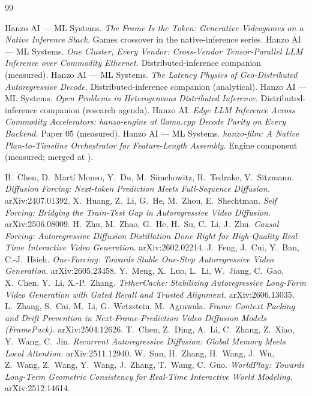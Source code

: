 \documentclass[11pt]{article}
\begin{document}
\begin{thebibliography}{99}
\small

 Hanzo AI --- ML Systems. \emph{The Frame Is the Token: Generative Videogames on a Native
Inference Stack.} Games crossover in the native-inference series.
 Hanzo AI --- ML Systems. \emph{One Cluster, Every Vendor: Cross-Vendor Tensor-Parallel LLM
Inference over Commodity Ethernet.} Distributed-inference companion (measured).
 Hanzo AI --- ML Systems. \emph{The Latency Physics of Geo-Distributed Autoregressive Decode.}
Distributed-inference companion (analytical).
 Hanzo AI --- ML Systems. \emph{Open Problems in Heterogeneous Distributed Inference.}
Distributed-inference companion (research agenda).
 Hanzo AI. \emph{Edge LLM Inference Across Commodity Accelerators: hanzo-engine at llama.cpp
Decode Parity on Every Backend.} Paper 05 (measured).
 Hanzo AI --- ML Systems. \emph{hanzo-film: A Native Plan-to-Timeline Orchestrator for
Feature-Length Assembly.} Engine component (measured; merged at ).

 B.\ Chen, D.\ Mart\'i Monso, Y.\ Du, M.\ Simchowitz, R.\ Tedrake, V.\ Sitzmann.
\emph{Diffusion Forcing: Next-token Prediction Meets Full-Sequence Diffusion.} arXiv:2407.01392.
 X.\ Huang, Z.\ Li, G.\ He, M.\ Zhou, E.\ Shechtman. \emph{Self Forcing: Bridging the
Train-Test Gap in Autoregressive Video Diffusion.} arXiv:2506.08009.
 H.\ Zhu, M.\ Zhao, G.\ He, H.\ Su, C.\ Li, J.\ Zhu. \emph{Causal Forcing: Autoregressive
Diffusion Distillation Done Right for High-Quality Real-Time Interactive Video Generation.} arXiv:2602.02214.
 J.\ Feng, J.\ Cui, Y.\ Ban, C.-J.\ Hsieh. \emph{One-Forcing: Towards Stable One-Step
Autoregressive Video Generation.} arXiv:2605.23458.
 Y.\ Meng, X.\ Luo, L.\ Li, W.\ Jiang, C.\ Gao, X.\ Chen, Y.\ Li, X.-P.\ Zhang.
\emph{TetherCache: Stabilizing Autoregressive Long-Form Video Generation with Gated Recall and Trusted
Alignment.} arXiv:2606.13035.
 L.\ Zhang, S.\ Cai, M.\ Li, G.\ Wetzstein, M.\ Agrawala. \emph{Frame Context Packing and
Drift Prevention in Next-Frame-Prediction Video Diffusion Models (FramePack).} arXiv:2504.12626.
 T.\ Chen, Z.\ Ding, A.\ Li, C.\ Zhang, Z.\ Xiao, Y.\ Wang, C.\ Jin. \emph{Recurrent Autoregressive
Diffusion: Global Memory Meets Local Attention.} arXiv:2511.12940.
 W.\ Sun, H.\ Zhang, H.\ Wang, J.\ Wu, Z.\ Wang, Z.\ Wang, Y.\ Wang, J.\ Zhang, T.\ Wang,
C.\ Guo. \emph{WorldPlay: Towards Long-Term Geometric Consistency for Real-Time Interactive World Modeling.}
arXiv:2512.14614.


\end{thebibliography}
\end{document}
